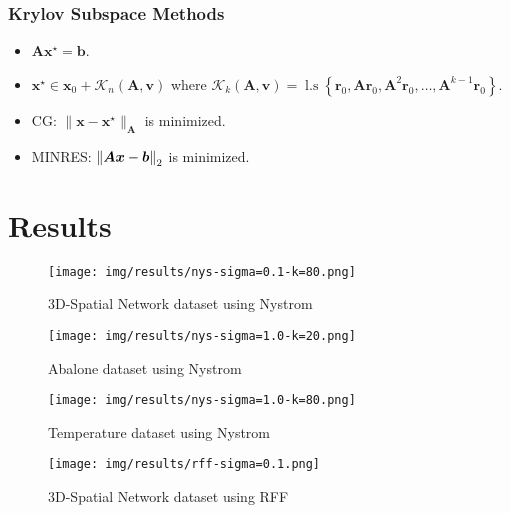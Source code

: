 \documentclass[9pt,hyperref={pdfpagelabels=false},xcolor=table]{beamer}
\begin{document}
\begin{frame}
    \frametitle{Krylov Subspace Methods}
    \begin{itemize}
        \item $\bm{A} \bm{x^{\star}} = \bm{b}$.
              \pause
              \bigskip
        \item $\bm{x^{\star}} \in \bm{x}_0 + \mathcal{K}_{n} \left( \bm{A},\bm{v} \right)$ where  $\mathcal{K}_{k} \left( \bm{A},\bm{v} \right) = \operatorname{l.s} \left\{ \bm{r}_0, \bm{A} \bm{r}_0, \bm{A}^2 \bm{r}_0, \ldots , \bm{A}^{k-1} \bm{r}_0 \right\}$.
              \pause
              \bigskip
        \item CG: $\| \bm{x} - \bm{x}^{\star} \|_{\bm{A}}$ is minimized.
              \pause
              \bigskip
        \item MINRES: $\left\lVert\bm{A} \bm {x} - \bm{b}\right\rVert_2$ is minimized.
    \end{itemize}
\end{frame}

\section{Results}

\begin{frame}
    \begin{figure}
        \centering
        \texttt{[image: img/results/nys-sigma=0.1-k=80.png]}
        \caption{3D-Spatial Network dataset using Nystrom}
    \end{figure}
\end{frame}

\begin{frame}
    \begin{figure}
        \centering
        \texttt{[image: img/results/nys-sigma=1.0-k=20.png]}
        \caption{Abalone dataset using Nystrom}
    \end{figure}
\end{frame}

\begin{frame}
    \begin{figure}
        \centering
        \texttt{[image: img/results/nys-sigma=1.0-k=80.png]}
        \caption{Temperature dataset using Nystrom}
    \end{figure}
\end{frame}

\begin{frame}
    \begin{figure}
        \centering
        \texttt{[image: img/results/rff-sigma=0.1.png]}
        \caption{3D-Spatial Network dataset using RFF}
    \end{figure}
\end{frame}
\end{document}
